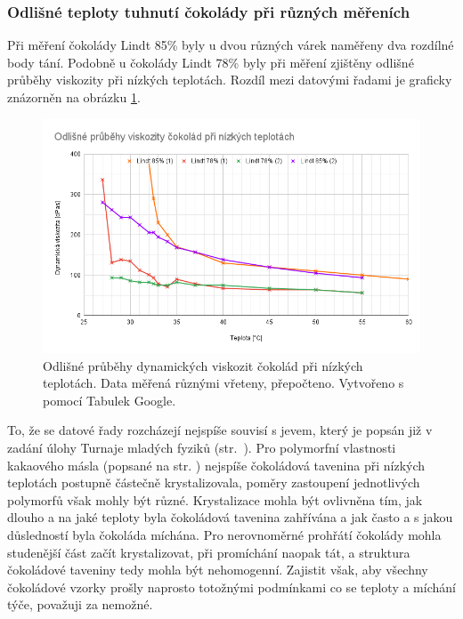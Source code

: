 \documentclass[12pt]{article}
\begin{document}
\subsubsection{Odlišné teploty tuhnutí čokolády při různých měřeních}

Při měření čokolády Lindt 85\% byly u dvou různých várek naměřeny dva rozdílné body tání. Podobně u čokolády Lindt 78\% byly při měření zjištěny odlišné průběhy viskozity při nízkých teplotách. Rozdíl mezi datovými řadami je graficky znázorněn na obrázku \ref{fig:coko_nizke_teploty}.
\begin{figure}
    \centering
    \includegraphics[width = \linewidth]{figures/coko_nizke_teploty.png}
    \caption{Odlišné průběhy dynamických viskozit čokolád při nízkých teplotách. Data měřená různými vřeteny, přepočteno. Vytvořeno s pomocí Tabulek Google.}
    \label{fig:coko_nizke_teploty}
\end{figure}
\par\noindent

To, že se datové řady rozcházejí nejspíše souvisí s jevem, který je popsán již v zadání úlohy Turnaje mladých fyziků (str.~\pageref{sec:zadani_tmf}). Pro polymorfní vlastnosti kakaového másla (popsané na str. \pageref{sec:polymorfie}) nejspíše čokoládová tavenina při nízkých teplotách postupně částečně krystalizovala, poměry zastoupení jednotlivých polymorfů však mohly být různé. Krystalizace mohla být ovlivněna tím, jak dlouho a na jaké teploty byla čokoládová tavenina zahřívána a jak často a s jakou důsledností byla čokoláda míchána. Pro nerovnoměrné prohřátí čokolády mohla studenější část začít krystalizovat, při promíchání naopak tát, a struktura čokoládové taveniny tedy mohla být nehomogenní. Zajistit však, aby všechny čokoládové vzorky prošly naprosto totožnými podmínkami co se teploty a míchání týče, považuji za nemožné.
\end{document}

